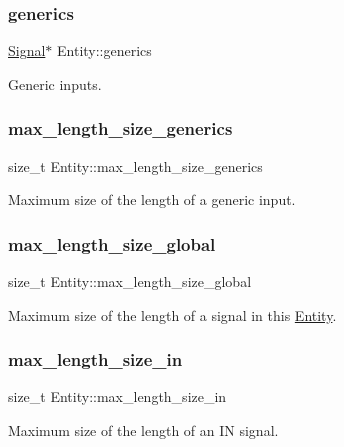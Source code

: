 \subsubsection{\texorpdfstring{generics}{generics}}
{\footnotesize\ttfamily \mbox{\hyperlink{struct_signal}{Signal}}$\ast$ Entity\+::generics}

Generic inputs. \mbox{\label{struct_entity_a9822957e550360cb5cddf1c39bb02f7c}} 
\subsubsection{\texorpdfstring{max\_length\_size\_generics}{max\_length\_size\_generics}}
{\footnotesize\ttfamily size\+\_\+t Entity\+::max\+\_\+length\+\_\+size\+\_\+generics}

Maximum size of the length of a generic input. \mbox{\label{struct_entity_a36ae5682c01accd9d4335055ab0eca05}} 
\subsubsection{\texorpdfstring{max\_length\_size\_global}{max\_length\_size\_global}}
{\footnotesize\ttfamily size\+\_\+t Entity\+::max\+\_\+length\+\_\+size\+\_\+global}

Maximum size of the length of a signal in this \mbox{\hyperlink{struct_entity}{Entity}}. \mbox{\label{struct_entity_a3dc25f084d7d9f51ec16d4154d8d7153}} 
\subsubsection{\texorpdfstring{max\_length\_size\_in}{max\_length\_size\_in}}
{\footnotesize\ttfamily size\+\_\+t Entity\+::max\+\_\+length\+\_\+size\+\_\+in}

Maximum size of the length of an IN signal. \mbox{\label{struct_entity_a0833c90ebe1f08cc102e27d9a7ee87ff}} 

